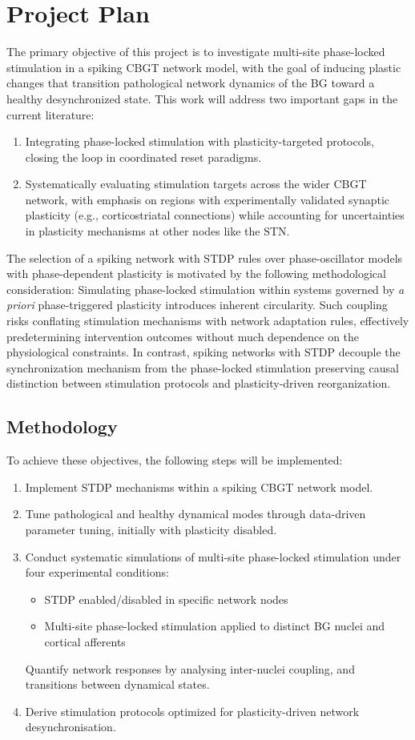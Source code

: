 \section{Project Plan}
The primary objective of this project is to investigate multi-site phase-locked stimulation in a spiking CBGT network
model, with the goal of inducing plastic changes that transition pathological network dynamics of the BG toward
a healthy desynchronized state. This work will address two important gaps in the current literature:
\begin{enumerate}[nosep]
	\item Integrating phase-locked stimulation with plasticity-targeted protocols, closing the loop in coordinated
	      reset paradigms.
	\item Systematically evaluating stimulation targets across the wider CBGT network, with emphasis on regions with
	      experimentally validated synaptic plasticity (e.g., corticostriatal connections) while accounting for
	      uncertainties in plasticity mechanisms at other nodes like the STN.
\end{enumerate}
The selection of a spiking network with STDP rules over phase-oscillator models with phase-dependent plasticity is
motivated by the following methodological consideration:
Simulating phase-locked stimulation within systems governed by \textit{a priori} phase-triggered plasticity introduces
inherent circularity.
Such coupling risks conflating stimulation mechanisms with network adaptation rules, effectively predetermining
intervention outcomes without much dependence on the physiological constraints.
In contrast, spiking networks with STDP decouple the synchronization mechanism from the phase-locked stimulation
preserving causal distinction between stimulation protocols and plasticity-driven reorganization.

\subsection{Methodology}
To achieve these objectives, the following steps will be implemented:
\begin{enumerate}[nosep]
	\item Implement STDP mechanisms within a spiking CBGT network model.
	\item Tune pathological and healthy dynamical modes through data-driven parameter tuning, initially with plasticity disabled.
	\item Conduct systematic simulations of multi-site phase-locked stimulation under four experimental conditions:
	      \begin{itemize}[nosep]
		      \item STDP enabled/disabled in specific network nodes
		      \item Multi-site phase-locked stimulation applied to distinct BG nuclei and cortical afferents
	      \end{itemize}
	      Quantify network responses by analysing inter-nuclei coupling, and transitions between dynamical states.
	\item Derive stimulation protocols optimized for plasticity-driven network desynchronisation.
\end{enumerate}

